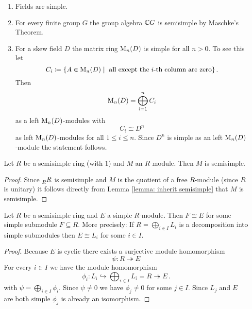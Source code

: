 \begin{example}
  \begin{enumerate}[label=\emph{\alph*)},leftmargin=*]
    \item
      Fields are simple.
    \item
      For every finite group $G$ the group algebra $\mathbb{C} G$ is semisimple by Maschke’s Theorem.
    \item
      For a skew field $D$ the matrix ring $\operatorname{M}_n(D)$ is simple for all $n > 0$.
      To see this let
      \[
        C_i
        \coloneqq \{
                    A \in \operatorname{M}_n(D)
                  \mid
                    \text{ all except the $i$-th column are zero}
                  \} \,.
      \]
      Then
      \[
          \operatorname{M}_n(D)
        = \bigoplus_{i=1}^n C_i
      \]
      as a left $\operatorname{M}_n(D)$-modules with
      \[
        C_i \cong D^n
      \]
      as left $\operatorname{M}_n(D)$-modules for all $1 \leq i \leq n$.
      Since $D^n$ is simple as an left $\operatorname{M}_n(D)$-module the statement follows.
  \end{enumerate}
\end{example}


\begin{proposition}
  Let $R$ be a semisimple ring (with $1$) and $M$ an $R$-module.
  Then $M$ is semisimple.
\end{proposition}
\begin{proof}
  Since $\prescript{}{R}{R}$ is semisimple and $M$ is the quotient of a free $R$-module (since $R$ is unitary) it follows directly from Lemma \ref{lemma: inherit semisimple} that $M$ is semisimple.
\end{proof}


\begin{lemma}\label{lemma: simple module of semisimple ring is direct summand}
  Let $R$ be a semisimple ring and $E$ a simple $R$-module.
  Then $F \cong E$ for some simple submodule $F \subseteq R$.
  More precisely:
  If $R = \bigoplus_{i \in I} L_i$ is a decomposition into simple submodules then $E \cong L_i$ for some $i \in I$.
\end{lemma}
\begin{proof}
  Because $E$ is cyclic there exists a surjective module homomorphism
  \[
                        \psi
    \colon              R
    \twoheadrightarrow  E
  \]
  For every $i \in I$ we have the module homomorphism
  \[
                        \phi_i
    \colon              L_i
    \hookrightarrow     \bigoplus_{i \in I} L_i
    =                   R
    \twoheadrightarrow  E \,.
  \]
  with $\psi = \bigoplus_{i \in I} \phi_i$.
  Since $\psi \neq 0$ we have $\phi_j \neq 0$ for some $j \in I$.
  Since $L_j$ and $E$ are both simple $\phi_j$ is already an isomorphism.
\end{proof}


